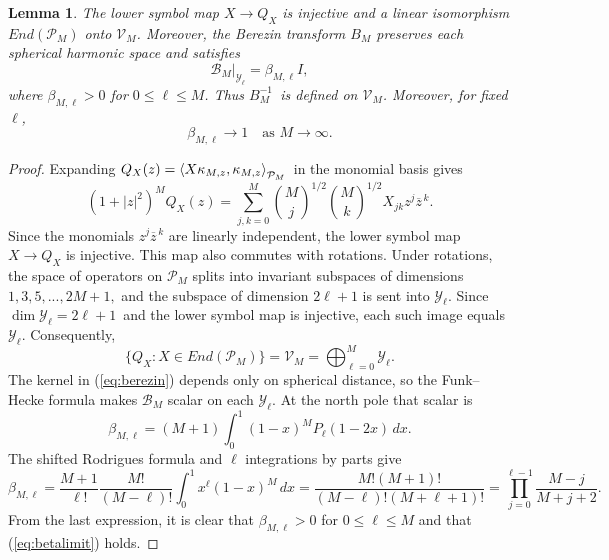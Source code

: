 \documentclass[12pt]{amsart}
\theoremstyle{plain}
\newtheorem{lemma}[theorem]{Lemma}
\theoremstyle{definition}
\theoremstyle{remark}
\numberwithin{equation}{section}
\newcommand{\1}{\mathbf 1}
\begin{document}
\begin{lemma}
\label{lem:berezincalculus} The lower symbol map $X\rightarrow Q_{X}$ is
injective and a linear isomorphism $End(\mathcal{P}_{M})$ onto $\mathcal{V}%
_{M}$. Moreover, the Berezin transform $B_{M}$ preserves each spherical
harmonic space and satisfies 
\begin{equation}
\mathcal{B}_{M}|_{\mathcal{Y}_{\ell }}=\beta _{M,\ell }I,
\label{eq:berezineigenvalue}
\end{equation}%
where $\beta _{M,\ell }>0$ for $0\leq \ell \leq M$. Thus $B_{M}^{-1}$\ is
defined on $\mathcal{V}_{M}$. Moreover, for fixed $\ell $, 
\begin{equation}
\beta _{M,\ell }\longrightarrow 1\quad \text{as }M\longrightarrow \infty .
\label{eq:betalimit}
\end{equation}
\end{lemma}

\begin{proof}
Expanding $Q_{X}(z)=\left\langle X\kappa _{M,z},\kappa _{M,z}\right\rangle _{%
\mathcal{P}_{M}}$\ in the monomial basis gives 
\begin{equation}
(1+|z|^{2})^{M}Q_{X}(z)=\sum_{j,k=0}^{M}\binom{M}{j}^{1/2}\binom{M}{k}%
^{1/2}X_{jk}z^{j}\overline{z}^{\,k}.  \label{eq:lowersymbolpolynomial}
\end{equation}%
Since the monomials $z^{j}\overline{z}^{\,k}$ are linearly independent, the
lower symbol map $X\rightarrow Q_{X}$ is injective. This map also commutes
with rotations. Under rotations, the space of operators on $\mathcal{P}_{M}$
splits into invariant subspaces of dimensions $1,3,5,...,2M+1,$ and the
subspace of dimension $2\ell +1$ is sent into $\mathcal{Y}_{\ell }$. Since $%
\dim \mathcal{Y}_{\ell }=2\ell +1$\ and the lower symbol map is injective,
each such image equals $\mathcal{Y}_{\ell }$. Consequently,%
\begin{equation*}
\{Q_{X}:X\in End(\mathcal{P}_{M})\}=\mathcal{V}_{M}=\bigoplus_{\ell =0}^{M}%
\mathcal{Y}_{\ell }\text{.}
\end{equation*}%
The kernel in (\ref{eq:berezin}) depends only on spherical distance, so the
Funk--Hecke formula makes $\mathcal{B}_{M}$ scalar on each $\mathcal{Y}%
_{\ell }$. At the north pole that scalar is 
\begin{equation*}
\beta _{M,\ell }=(M+1)\int_{0}^{1}(1-x)^{M}P_{\ell }(1-2x)\,dx.
\end{equation*}%
The shifted Rodrigues formula and $\ell $ integrations by parts give 
\begin{equation*}
\beta _{M,\ell }=\frac{M+1}{\ell !}\frac{M!}{(M-\ell )!}\int_{0}^{1}x^{\ell
}(1-x)^{M}\,dx=\frac{M!(M+1)!}{(M-\ell )!(M+\ell +1)!}=\prod_{j=0}^{\ell -1}%
\frac{M-j}{M+j+2}.
\end{equation*}%
From the last expression, it is clear that $\beta _{M,\ell }>0$ for $0\leq
\ell \leq M$ and that (\ref{eq:betalimit}) holds. 
\end{proof}
\end{document}

